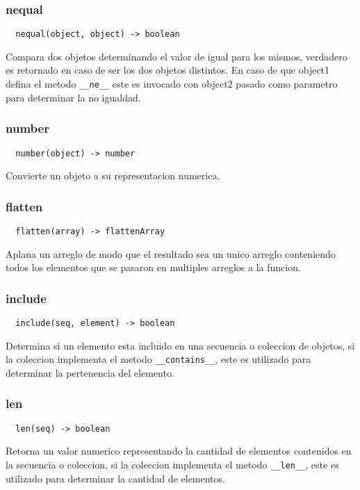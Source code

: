 \subsubsection*{nequal}
\begin{verbatim}
  nequal(object, object) -> boolean
\end{verbatim}
Compara dos objetos determinando el valor de igual para los mismos, verdadero es
retornado en caso de ser los dos objetos distintos.
En caso de que object1 defina el metodo \verb|__ne__| este es invocado con
object2
pasado como parametro para determinar la no igualdad.

\subsubsection*{number}
\begin{verbatim}
  number(object) -> number
\end{verbatim}
Convierte un objeto a su representacion numerica.

\subsubsection*{flatten}
\begin{verbatim}
  flatten(array) -> flattenArray
\end{verbatim}
Aplana un arreglo de modo que el resultado sea un unico arreglo conteniendo
todos los elementos que se pasaron en multiples arreglos a la funcion.

\subsubsection*{include}
\begin{verbatim}
  include(seq, element) -> boolean
\end{verbatim}
Determina si un elemento esta incluido en una secuencia o coleccion de objetos,
si la coleccion implementa el metodo \verb|__contains__|, este es utilizado para
determinar la pertenencia del elemento.

\subsubsection*{len}
\begin{verbatim}
  len(seq) -> boolean
\end{verbatim}
Retorna un valor numerico representando la cantidad de elementos contenidos en
la secuencia o coleccion, si la coleccion implementa el metodo \verb|__len__|,
este es utilizado para determinar la cantidad de elementos.

